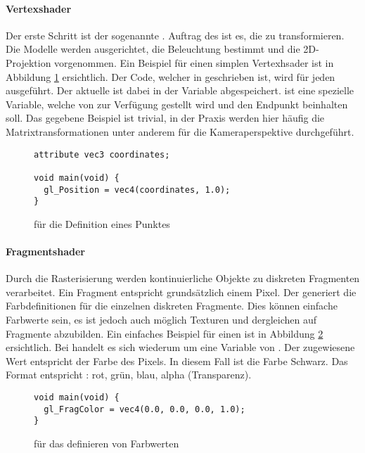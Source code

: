 \paragraph{Vertexshader}
Der erste Schritt ist der sogenannte . Auftrag des  ist es, die  zu transformieren. Die Modelle werden ausgerichtet, die Beleuchtung bestimmt und die 2D-Projektion vorgenommen. Ein Beispiel für einen simplen Vertexhsader ist in Abbildung \ref{fig:vertexShader} ersichtlich. Der Code, welcher in  geschrieben ist, wird für jeden  ausgeführt. Der aktuelle  ist dabei in der Variable  abgespeichert.  ist eine spezielle Variable, welche von  zur Verfügung gestellt wird und den Endpunkt beinhalten soll. Das gegebene Beispiel ist trivial, in der Praxis werden hier häufig die Matrixtransformationen unter anderem für die Kameraperspektive durchgeführt.

\begin{figure}[H]
\begin{lstlisting}[style=glsl]
attribute vec3 coordinates;

void main(void) {
  gl_Position = vec4(coordinates, 1.0);
}
\end{lstlisting}
\caption{ für die Definition eines Punktes}
\label{fig:vertexShader}
\end{figure}

\paragraph{Fragmentshader}
Durch die Rasterisierung werden kontinuierliche Objekte zu diskreten Fragmenten verarbeitet. Ein Fragment entspricht grundsätzlich einem Pixel. Der  generiert die Farbdefinitionen für die einzelnen diskreten Fragmente. Dies können einfache Farbwerte sein, es ist jedoch auch möglich Texturen und dergleichen auf Fragmente abzubilden. Ein einfaches Beispiel für einen  ist in Abbildung \ref{fig:fragmentShader} ersichtlich. Bei  handelt es sich wiederum um eine Variable von . Der zugewiesene Wert entspricht der Farbe des Pixels. In diesem Fall ist die Farbe Schwarz. Das Format entspricht : rot, grün, blau, alpha (Transparenz).

\begin{figure}[H]
\begin{lstlisting}[style=glsl]
void main(void) {
  gl_FragColor = vec4(0.0, 0.0, 0.0, 1.0);
}
\end{lstlisting}
\caption{ für das definieren von Farbwerten}
\label{fig:fragmentShader}
\end{figure}


